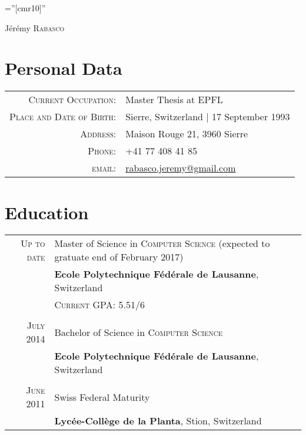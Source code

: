 \documentclass[a4paper,10pt]{article}
\begin{document}
\pagestyle{empty}
\font\fb=''[cmr10]''

\par{\centering
		{\Huge Jérémy \textsc{Rabasco}
	}\bigskip\par}

\section{Personal Data}

\begin{tabular}{rl}
	\textsc{Current Occupation:} & Master Thesis at EPFL\\
	\textsc{Place and Date of Birth:} & Sierre, Switzerland | 17 September 1993 \\
	\textsc{Address:}   & Maison Rouge 21, 3960 Sierre \\
	\textsc{Phone:}     & +41 77 408 41 85\\
	\textsc{email:}     & \href{mailto:rabasco.jeremy@gmail.com}{rabasco.jeremy@gmail.com}
\end{tabular}

\section{Education}
\begin{tabular}{rl}	
	\textsc{Up to date} & Master of Science in \textsc{Computer Science} (expected to gratuate end of February 2017)\\
	& \textbf{Ecole Polytechnique Fédérale de Lausanne}, Switzerland\\
	&\normalsize \textsc{Current GPA}: 5.51/6\\\\
	\textsc{July} 2014 & Bachelor of Science in \textsc{Computer Science}\\
	& \textbf{Ecole Polytechnique Fédérale de Lausanne}, Switzerland\\\\
	\textsc{June 2011} & Swiss Federal Maturity\\
	&\textbf{Lycée-Collège de la Planta}, Stion, Switzerland
\end{tabular}

\end{document}
